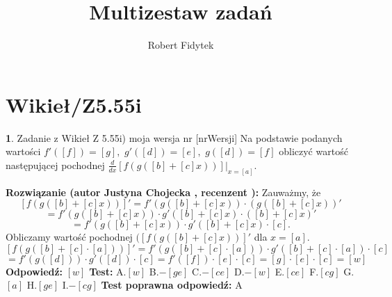 \documentclass[12pt, a4paper]{article}
\title{Multizestaw zadań}
\author{Robert Fidytek}
\date{}
\theoremstyle{definition} %
\newtheorem{zad}{}
\newcommand{\kategoria}[1]{\section{#1}} %
\newcommand{\zadStart}[1]{\begin{zad}#1\newline} %
\newcommand{\zadStop}{\end{zad}}   %
\newcommand{\rozwStart}[2]{\noindent \textbf{Rozwiązanie (autor #1 , recenzent #2): }\newline} %
\newcommand{\rozwStop}{\newline}                                            %
\newcommand{\odpStart}{\noindent \textbf{Odpowiedź:}\newline}    %
\newcommand{\odpStop}{\newline}                                             %
\newcommand{\testStart}{\noindent \textbf{Test:}\newline} %
\newcommand{\testStop}{\newline} %
\newcommand{\kluczStart}{\noindent \textbf{Test poprawna odpowiedź:}\newline} %
\newcommand{\kluczStop}{\newline} %
\begin{document}
\maketitle


\kategoria{Wikieł/Z5.55i}
\zadStart{Zadanie z Wikieł Z 5.55i) moja wersja nr [nrWersji]}
Na podstawie podanych wartości $f'([f])=[g],$ $g'([d])=[e],$ $g([d])=[f]$ obliczyć wartość następującej pochodnej $\frac{d}{dx}\left[f(g([b]+[c]x))\right]\big |_{x=[a]}$.
\zadStop
\rozwStart{Justyna Chojecka}{}
Zauważmy, że 
$$\left[f(g([b]+[c]x))\right]'=f'(g([b]+[c]x))\cdot \left(g([b]+[c]x)\right)'$$$$=f'(g([b]+[c]x))\cdot g'([b]+[c]x)\cdot ([b]+[c]x)'$$$$=f'(g([b]+[c]x))\cdot g'([b]+[c]x)\cdot [c].$$
Obliczamy wartość pochodnej $(\left[f(g([b]+[c]x))\right]'$ dla $x=[a]$.
$$\left[f(g([b]+[c]\cdot [a]))\right]'=f'(g([b]+[c]\cdot [a]))\cdot g'([b]+[c]\cdot [a])\cdot [c]$$$$=f'(g([d]))\cdot g'([d])\cdot [c]=f'([f])\cdot [e]\cdot [c]=[g]\cdot [e] \cdot [c]=[w]$$
\rozwStop
\odpStart
$[w]$
\odpStop
\testStart
A.$[w]$
B.$-[ge]$
C.$-[ce]$
D.$-[w]$
E.$[ce]$
F.$[cg]$
G.$[a]$
H.$[ge]$
I.$-[cg]$
\testStop
\kluczStart
A
\kluczStop
\end{document}
